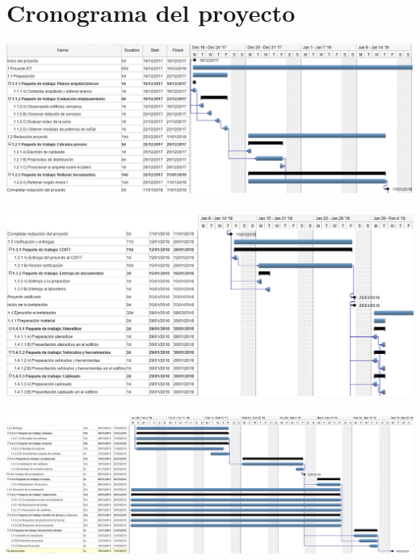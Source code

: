 \section{Cronograma del proyecto}

\includegraphics[scale=0.48]{project/images/c1.png} \\
\\
\includegraphics[scale=0.5]{project/images/c2.png} \\
\\
\includegraphics[scale=0.37]{project/images/c3.png} \\
